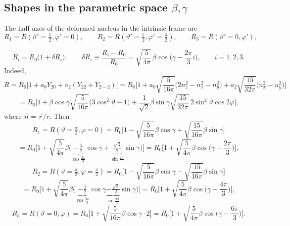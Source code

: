 \documentclass[11pt,a4paper]{article}
\begin{document}
\subsection{Shapes in the parametric space \texorpdfstring{$\beta,\gamma$}{beta, gamma}}
The half-axes of the deformed nucleus in the intrinsic frame are
\[
R_1=R(\vartheta'{=}\tfrac\pi2,\varphi'{=}0),\qquad
R_2=R(\vartheta'{=}\tfrac\pi2,\varphi'{=}\tfrac\pi2),\qquad
R_3=R(\vartheta'{=}0,\varphi'),
\]
\begin{center}
\end{center}
\[
R_i=R_0\big(1+\delta R_i\big),\qquad
\delta R_i\equiv\frac{R_i-R_0}{R_0}=\sqrt{\frac{5}{4\pi}}\,\beta\cos\Big(\gamma-\frac{2\pi}{3}i\Big),\qquad i=1,2,3 .
\]
Indeed,
\[
R=R_0\big[1+a_0Y_{20}+a_2(Y_{22}+Y_{2-2})\big]
=R_0\Big[1+a_0\sqrt{\frac{5}{16\pi}}\big(2n_z^2-n_x^2-n_y^2\big)+a_2\sqrt{\frac{15}{32\pi}}\big(n_x^2-n_y^2\big)\Big]
\]
\[
=R_0\Big[1+\beta\cos\gamma\sqrt{\frac{5}{16\pi}}\big(3\cos^2\vartheta-1\big)+\frac{1}{\sqrt2}\beta\sin\gamma\sqrt{\frac{15}{32\pi}}\,2\sin^2\vartheta\cos2\varphi\Big],
\]
where $\vec n=\vec r/r$. Then
\[
R_1=R(\vartheta{=}\tfrac\pi2,\varphi{=}0)=R_0\Big[1-\sqrt{\frac{5}{16\pi}}\beta\cos\gamma+\sqrt{\frac{15}{16\pi}}\beta\sin\gamma\Big]
\]
\[
=R_0\Big[1+\sqrt{\frac{5}{4\pi}}\beta\Big(\underbrace{-\tfrac12}_{\cos\frac{2\pi}{3}}\cos\gamma+\underbrace{\tfrac{\sqrt3}{2}}_{\sin\frac{2\pi}{3}}\sin\gamma\Big)\Big]
=R_0\Big[1+\sqrt{\frac{5}{4\pi}}\beta\cos\Big(\gamma-\frac{2\pi}{3}\Big)\Big],
\]
\[
R_2=R(\vartheta{=}\tfrac\pi2,\varphi{=}\tfrac\pi2)=R_0\Big[1-\sqrt{\frac{5}{16\pi}}\beta\cos\gamma-\sqrt{\frac{15}{16\pi}}\beta\sin\gamma\Big]
\]
\[
=R_0\Big[1+\sqrt{\frac{5}{4\pi}}\beta\Big(\underbrace{-\tfrac12}_{\cos\frac{4\pi}{3}}\cos\gamma\underbrace{-\tfrac{\sqrt3}{2}}_{\sin\frac{4\pi}{3}}\sin\gamma\Big)\Big]
=R_0\Big[1+\sqrt{\frac{5}{4\pi}}\beta\cos\Big(\gamma-\frac{4\pi}{3}\Big)\Big],
\]
\[
R_3=R(\vartheta{=}0,\varphi)=R_0\Big[1+\sqrt{\frac{5}{16\pi}}\beta\cos\gamma\cdot2\Big]=R_0\Big[1+\sqrt{\frac{5}{4\pi}}\beta\cos\Big(\gamma-\frac{6\pi}{3}\Big)\Big].
\]
\end{document}
